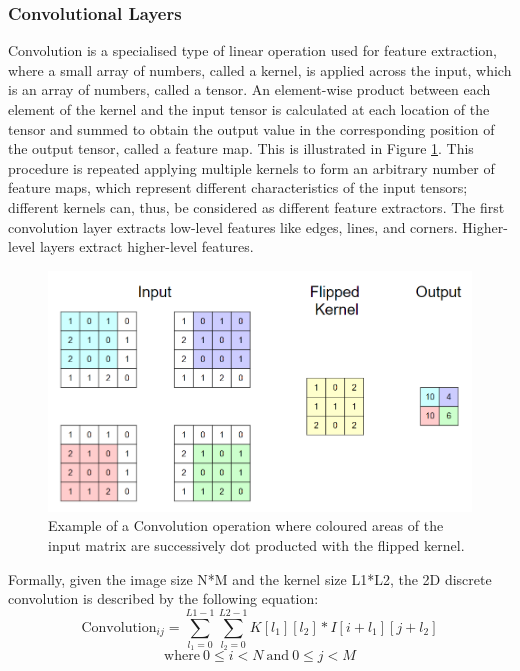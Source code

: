 \subsubsection*{Convolutional Layers}

Convolution is a specialised type of linear operation used for feature extraction, where a small array of numbers, called a kernel, is applied across the input, which is an array of numbers, called a tensor. An element-wise product between each element of the kernel and the input tensor is calculated at each location of the tensor and summed to obtain the output value in the corresponding position of the output tensor, called a feature map. This is illustrated in Figure \ref{Convolution}. This procedure is repeated applying multiple kernels to form an arbitrary number of feature maps, which represent different characteristics of the input tensors; different kernels can, thus, be considered as different feature extractors. The first convolution layer extracts low-level features like edges, lines, and corners. Higher-level layers extract higher-level features. \\

\begin{figure}[H]
  \centering
  \includegraphics[scale = 0.6]{Images/convolution.png}
  \caption{Example of a Convolution operation where coloured areas of the input matrix are successively dot producted with the flipped kernel.}
  \label{Convolution}
\end{figure}

Formally, given the image size N*M and the kernel size L1*L2, the 2D discrete convolution is described by the following equation: \\

\begin{equation}
  \text{Convolution}_{ij} = \sum_{l_1=0}^{L1-1} \sum_{l_2=0}^{L2-1} K[l_1][l_2]*I[i+l_1][j+l_2]
\end{equation}
$$\text{where} \ 0 \leq i < N \ \text{and} \ 0 \leq j < M$$ \\

